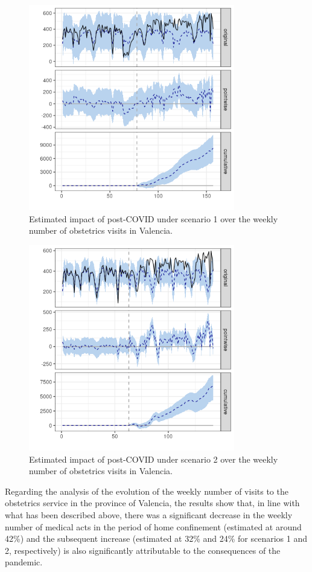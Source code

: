 \documentclass[9pt]{osa-supplemental-document}
\begin{document}
\begin{center}
\begin{figure}[H]
\includegraphics[width=9cm]{obstetrics_post_scen1_Valencia.png}\caption{Estimated impact of post-COVID under scenario 1 over the weekly number of obstetrics visits in Valencia.}
\end{figure}
\end{center}

\begin{center}
  \begin{figure}[H]
    \includegraphics[width=9cm]{obstetrics_post_scen2_Valencia.png}\caption{Estimated impact of post-COVID under scenario 2 over the weekly number of obstetrics visits in Valencia.}
  \end{figure}
  \end{center}

  Regarding the analysis of the evolution of the weekly number of visits to the obstetrics service in the province of Valencia, the results show that, in line with what has been described above, there was a significant decrease in the weekly number of medical acts in the period of home confinement (estimated at around 42\%) and the subsequent increase (estimated at 32\% and 24\% for scenarios 1 and 2, respectively) is also significantly attributable to the consequences of the pandemic.
\end{document}

